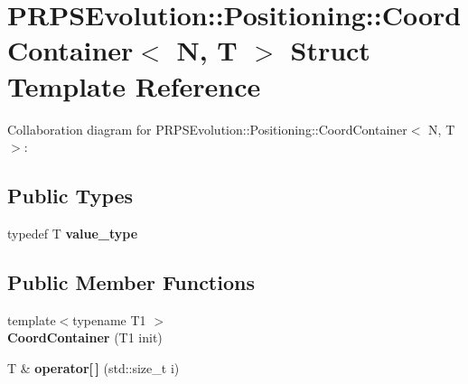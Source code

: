 \hypertarget{struct_p_r_p_s_evolution_1_1_positioning_1_1_coord_container}{\section{P\-R\-P\-S\-Evolution\-:\-:Positioning\-:\-:Coord\-Container$<$ N, T $>$ Struct Template Reference}
\label{struct_p_r_p_s_evolution_1_1_positioning_1_1_coord_container}
}


Collaboration diagram for P\-R\-P\-S\-Evolution\-:\-:Positioning\-:\-:Coord\-Container$<$ N, T $>$\-:
\subsection*{Public Types}
\begin{DoxyCompactItemize}
\item 
\hypertarget{struct_p_r_p_s_evolution_1_1_positioning_1_1_coord_container_aa81c47e8743b6045ffd3ac7f681a3172}{typedef T {\bfseries value\-\_\-type}}\label{struct_p_r_p_s_evolution_1_1_positioning_1_1_coord_container_aa81c47e8743b6045ffd3ac7f681a3172}

\end{DoxyCompactItemize}
\subsection*{Public Member Functions}
\begin{DoxyCompactItemize}
\item 
\hypertarget{struct_p_r_p_s_evolution_1_1_positioning_1_1_coord_container_afe883d4d3bfbe0ae5672ed6470d07f5d}{{\footnotesize template$<$typename T1 $>$ }\\{\bfseries Coord\-Container} (T1 init)}\label{struct_p_r_p_s_evolution_1_1_positioning_1_1_coord_container_afe883d4d3bfbe0ae5672ed6470d07f5d}

\item 
\hypertarget{struct_p_r_p_s_evolution_1_1_positioning_1_1_coord_container_a368a953b0794092caf3f30bef0e6b663}{T \& {\bfseries operator\mbox{[}$\,$\mbox{]}} (std\-::size\-\_\-t i)}\label{struct_p_r_p_s_evolution_1_1_positioning_1_1_coord_container_a368a953b0794092caf3f30bef0e6b663}

\end{DoxyCompactItemize}

